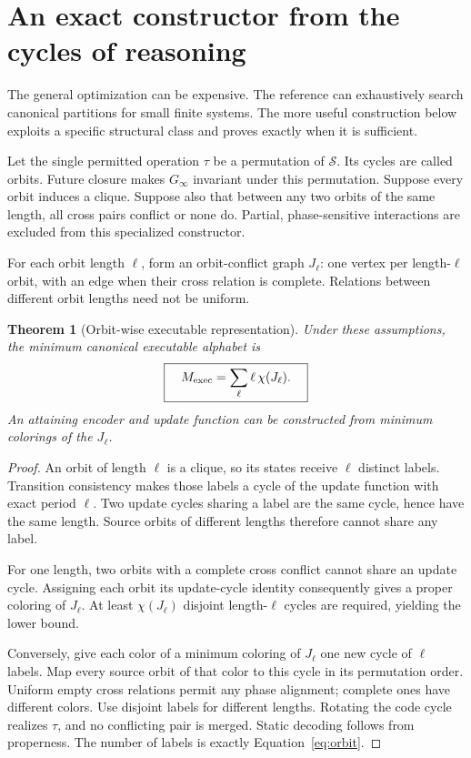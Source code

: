 \documentclass[11pt,letterpaper]{article}
\newcommand{\Sset}{\mathcal S}\newcommand{\Cset}{\mathcal C}
\newtheorem{theorem}{Theorem}[section]
\theoremstyle{remark}\newtheorem{remark}{Remark}[section]
\begin{document}
\section{An exact constructor from the cycles of reasoning}
\label{sec:orbit}
The general optimization can be expensive. The reference can exhaustively search canonical partitions for small finite systems. The more useful construction below exploits a specific structural class and proves exactly when it is sufficient.

Let the single permitted operation $\tau$ be a permutation of $\Sset$. Its cycles are called orbits. Future closure makes $G_\infty$ invariant under this permutation. Suppose every orbit induces a clique. Suppose also that between any two orbits of the same length, all cross pairs conflict or none do. Partial, phase-sensitive interactions are excluded from this specialized constructor.

For each orbit length $\ell$, form an orbit-conflict graph $J_\ell$: one vertex per length-$\ell$ orbit, with an edge when their cross relation is complete. Relations between different orbit lengths need not be uniform.

\begin{theorem}[Orbit-wise executable representation]\label{thm:orbit}
Under these assumptions, the minimum canonical executable alphabet is
\begin{equation}
\boxed{\quad M_{\rm exec}=\sum_{\ell}\ell\,\chi(J_\ell).\quad}\label{eq:orbit}
\end{equation}
An attaining encoder and update function can be constructed from minimum colorings of the $J_\ell$.
\end{theorem}
\begin{proof}
An orbit of length $\ell$ is a clique, so its states receive $\ell$ distinct labels. Transition consistency makes those labels a cycle of the update function with exact period $\ell$. Two update cycles sharing a label are the same cycle, hence have the same length. Source orbits of different lengths therefore cannot share any label.

For one length, two orbits with a complete cross conflict cannot share an update cycle. Assigning each orbit its update-cycle identity consequently gives a proper coloring of $J_\ell$. At least $\chi(J_\ell)$ disjoint length-$\ell$ cycles are required, yielding the lower bound.

Conversely, give each color of a minimum coloring of $J_\ell$ one new cycle of $\ell$ labels. Map every source orbit of that color to this cycle in its permutation order. Uniform empty cross relations permit any phase alignment; complete ones have different colors. Use disjoint labels for different lengths. Rotating the code cycle realizes $\tau$, and no conflicting pair is merged. Static decoding follows from properness. The number of labels is exactly Equation~\eqref{eq:orbit}.
\end{proof}
\end{document}
